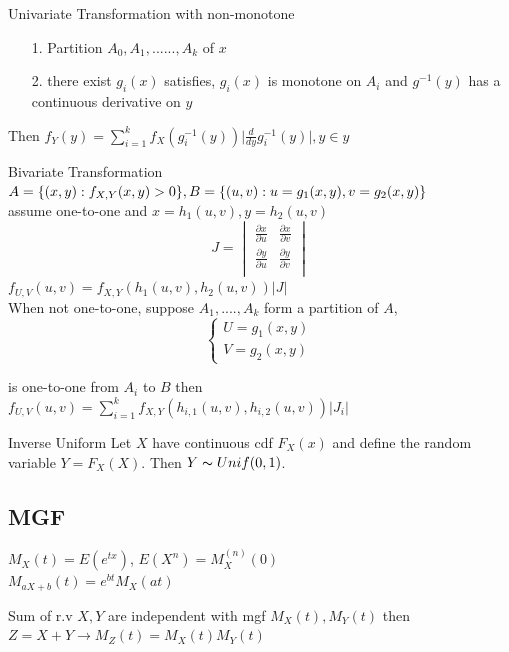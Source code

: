\documentclass{article}
\begin{document}
\begin{multicols*}{3}
\begin{thmbox}{Univariate Transformation with non-monotone}
\begin{enumerate}
\item [1.]Partition $A_0,A_1,......,A_k$ of $x$
\item [2.]there exist $g_i(x)$ satisfies, $g_i(x)$ is monotone on $A_i$ and $g^{-1}(y)$ has a continuous derivative on $y$
\end{enumerate}
Then $f_Y(y) = \sum^{k}_{i=1}f_X(g_{i}^{-1}(y))\lvert \frac{d}{dy}g_{i}^{-1}(y)\rvert, y \in y$
\end{thmbox}

\begin{thmbox}{Bivariate Transformation}
$A = \{(x,y): f_{X,Y}(x,y) > 0\}, \\ B = \{(u,v): u = g_1(x,y), v = g_2(x,y)\}$ \\ assume one-to-one and $x = h_1(u,v), y = h_2(u,v)$\\
 
\begin{equation}
J =
\begin{vmatrix}
\frac{\partial x}{\partial u} & \frac{\partial x}{\partial v}\\
\frac{\partial y}{\partial u} & \frac{\partial y}{\partial v}\\
\end{vmatrix} 
\end{equation}
$f_{U,V}(u,v) = f_{X,Y}(h_1(u,v), h_2(u,v))\lvert J\rvert$ \\

When not one-to-one, suppose $A_1,....,A_k$ form a partition of $A$, 
\begin{equation}
\begin{cases}
U = g_1(x,y) \\ 
V = g_2(x,y)
\end{cases}    
\end{equation}

is one-to-one from $A_i$ to $B$ then\\
$f_{U,V}(u,v) =\sum^{k}_{i=1} f_{X,Y}(h_{i,1}(u,v), h_{i,2}(u,v))\lvert J_i\rvert$
\end{thmbox}
\begin{thmbox}{Inverse Uniform}
Let $X$ have continuous cdf $F_X(x)$ and define the random variable $Y = F_X(X)$. Then $Y \thicksim Unif(0,1)$.
\end{thmbox}

\subsection{MGF}
$M_X(t) = E(e^{tx})$, $E(X^n) = M_X^{(n)}(0)$\\
$M_{aX + b}(t) = e^{bt}M_X(at)$
\begin{thmbox}{Sum of r.v}
$X,Y$ are independent with mgf $M_X(t), M_Y(t)$ then $Z = X + Y \rightarrow M_Z(t)  = M_X(t)M_Y(t)$
\end{thmbox}



\end{multicols*}
\end{document}
